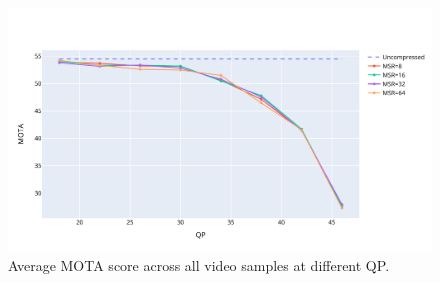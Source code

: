 \begin{figure}[!tb]
  \centering
  \includegraphics[width=1.0\linewidth]{img/averaged_result_all_qp.pdf}
  \caption[Averaged result of MOTA score from all video samples at different QP]
  {Average MOTA score across all video samples at different QP.}
  \label{fig:averaged_result_all_qp}
\end{figure}